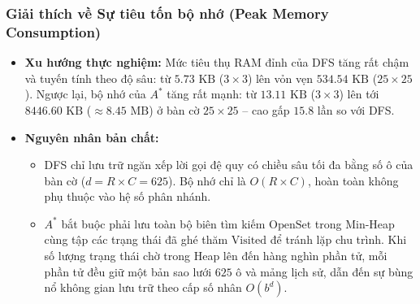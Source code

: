 \documentclass[a4paper]{article}
\begin{document}
\subsubsection{Giải thích về Sự tiêu tốn bộ nhớ (Peak Memory Consumption)}
\begin{itemize}
    \item \textbf{Xu hướng thực nghiệm:} Mức tiêu thụ RAM đỉnh của DFS tăng rất chậm và tuyến tính theo độ sâu: từ $5.73\text{ KB}$ ($3 \times 3$) lên vỏn vẹn $534.54\text{ KB}$ ($25 \times 25$). Ngược lại, bộ nhớ của $A^*$ tăng rất mạnh: từ $13.11\text{ KB}$ ($3 \times 3$) lên tới $8446.60\text{ KB}$ ($\approx 8.45\text{ MB}$) ở bàn cờ $25 \times 25$ -- cao gấp $15.8$ lần so với DFS.
    \item \textbf{Nguyên nhân bản chất:}
    \begin{itemize}
        \item DFS chỉ lưu trữ ngăn xếp lời gọi đệ quy có chiều sâu tối đa bằng số ô của bàn cờ ($d = R \times C = 625$). Bộ nhớ chỉ là $O(R \times C)$, hoàn toàn không phụ thuộc vào hệ số phân nhánh.
        \item $A^*$ bắt buộc phải lưu toàn bộ biên tìm kiếm $\text{OpenSet}$ trong Min-Heap cùng tập các trạng thái đã ghé thăm $\text{Visited}$ để tránh lặp chu trình. Khi số lượng trạng thái chờ trong Heap lên đến hàng nghìn phần tử, mỗi phần tử đều giữ một bản sao lưới $625$ ô và mảng lịch sử, dẫn đến sự bùng nổ không gian lưu trữ theo cấp số nhân $O(b^d)$.
    \end{itemize}
\end{itemize}
\end{document}
